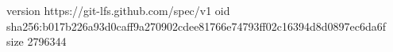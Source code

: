 version https://git-lfs.github.com/spec/v1
oid sha256:b017b226a93d0caff9a270902cdee81766e74793ff02c16394d8d0897ec6da6f
size 2796344
